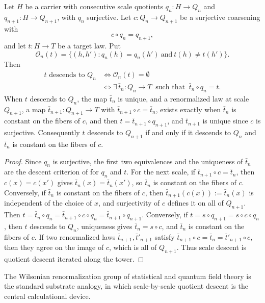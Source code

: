 \begin{theorem}\label{thm:F35}
Let \(H\) be a carrier with consecutive scale quotients
\(q_n:H\to Q_n\) and \(q_{n+1}:H\to Q_{n+1}\), with \(q_n\) surjective. Let
\(c:Q_n\to Q_{n+1}\) be a surjective coarsening with
\[
  c\circ q_n=q_{n+1},
\]
and let \(t:H\to T\) be a target law. Put
\[
  \mathcal O_n(t)=
  \{(h,h'):q_n(h)=q_n(h')\ \text{and}\ t(h)\ne t(h')\}.
\]
Then
\begin{align*}
  t \text{ descends to } Q_n
  &\iff \mathcal O_n(t)=\emptyset\\
  &\iff
  \exists\,\bar t_n:Q_n\to T\ \text{ such that }\
    \bar t_n\circ q_n=t .
\end{align*}
When \(t\) descends to \(Q_n\), the map \(\bar t_n\) is unique, and a
renormalized law at scale \(Q_{n+1}\), a map \(\bar t_{n+1}:Q_{n+1}\to T\) with
\(\bar t_{n+1}\circ c=\bar t_n\), exists exactly when \(\bar t_n\) is constant
on the fibers of \(c\), and then \(t=\bar t_{n+1}\circ q_{n+1}\), and \(\bar t_{n+1}\) is unique since \(c\) is surjective. Consequently
\(t\) descends to \(Q_{n+1}\) if and only if it descends to \(Q_n\) and
\(\bar t_n\) is constant on the fibers of \(c\).
\end{theorem}
\begin{proof}
Since \(q_n\) is surjective, the first two equivalences and the
uniqueness of \(\bar t_n\) are the descent criterion of
 for \(q_n\) and \(t\). For the next scale, if \(\bar t_{n+1}\circ c=\bar t_n\),
then \(c(x)=c(x')\) gives \(\bar t_n(x)=\bar t_n(x')\), so \(\bar t_n\) is
constant on the fibers of \(c\). Conversely, if \(\bar t_n\) is constant on
the fibers of \(c\), then \(\bar t_{n+1}(c(x)):=\bar t_n(x)\) is independent of
the choice of \(x\), and surjectivity of \(c\) defines it on all of
\(Q_{n+1}\). Then \(t=\bar t_n\circ q_n=\bar t_{n+1}\circ c\circ q_n=\bar t_{n+1}\circ q_{n+1}\).
Conversely, if \(t=s\circ q_{n+1}=s\circ c\circ q_n\), then \(t\) descends to
\(Q_n\), uniqueness gives \(\bar t_n=s\circ c\), and \(\bar t_n\) is constant on
the fibers of \(c\). If two renormalized laws \(\bar t_{n+1},\bar t'_{n+1}\)
satisfy \(\bar t_{n+1}\circ c=\bar t_n=\bar t'_{n+1}\circ c\), then they agree on
the image of \(c\), which is all of \(Q_{n+1}\). Thus scale descent is quotient
descent iterated along the tower.
\end{proof}

The Wilsonian renormalization group of statistical and quantum field
theory \citep{Wilson1975RG} is the standard substrate analogy, in
which scale-by-scale quotient descent is the central calculational
device.

